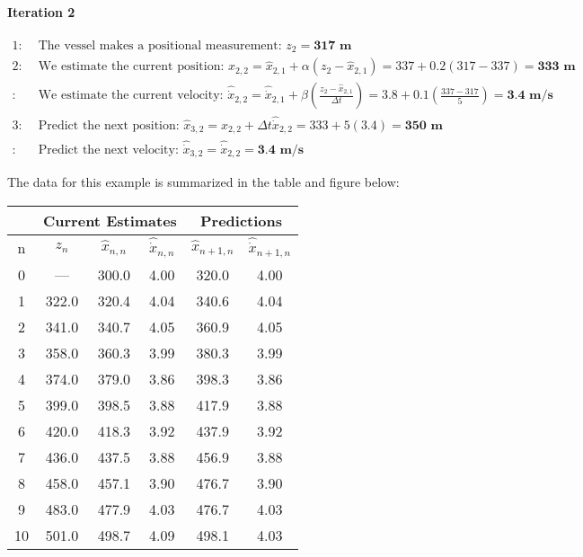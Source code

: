 \begin{example}
        \paragraph{Iteration 2}
        \begin{equation*}
            \begin{aligned} 
                1:& \text{ The vessel makes a positional measurement: } z_2 = \textbf{317 m} \\
                2:& \text{ We estimate the current position: } \hat{x}_{2,2} = \hat{x}_{2,1} + \alpha(z_2 - \hat{x}_{2,1}) = 337 + 0.2(317 - 337) = \textbf{333 m} \\
                 :& \text{ We estimate the current velocity: } \hat{\dot{x}}_{2,2} = \hat{\dot{x}}_{2,1} + \beta(\frac{z_2 - \hat{x}_{2,1}}{\Delta t}) = 3.8 + 0.1(\frac{337 - 317}{5}) = \textbf{3.4 m/s} \\
                3:& \text{ Predict the next position: } \hat{x}_{3,2} = \hat{x}_{2,2} + \Delta t \hat{\dot{x}}_{2,2} = 333 + 5(3.4) = \textbf{350 m} \\
                 :& \text{ Predict the next velocity: } \hat{\dot{x}}_{3,2} = \hat{\dot{x}}_{2,2} = \textbf{3.4 m/s}
            \end{aligned}
        \end{equation*}

        The data for this example is summarized in the table and figure below:

        \begin{center}
            \begin{tabular}{c | c | c | c | c | c}
            \toprule
            & \multicolumn{3}{|c|}{Current Estimates} & \multicolumn{2}{c}{Predictions} \\
            \midrule
            n & $z_n$ & $\hat{x}_{n,n}$ & $ \hat{\dot{x}}_{n,n} $ & $ \hat{x}_{n+1,n}$ & $ \hat{\dot{x}}_{n+1,n} $ \\
            \midrule

            0  &  ---  & 300.0 & 4.00 & 320.0 & 4.00 \\
            1  & 322.0 & 320.4 & 4.04 & 340.6 & 4.04 \\
            2  & 341.0 & 340.7 & 4.05 & 360.9 & 4.05 \\
            3  & 358.0 & 360.3 & 3.99 & 380.3 & 3.99 \\
            4  & 374.0 & 379.0 & 3.86 & 398.3 & 3.86 \\
            5  & 399.0 & 398.5 & 3.88 & 417.9 & 3.88 \\
            6  & 420.0 & 418.3 & 3.92 & 437.9 & 3.92 \\
            7  & 436.0 & 437.5 & 3.88 & 456.9 & 3.88 \\
            8  & 458.0 & 457.1 & 3.90 & 476.7 & 3.90 \\
            9  & 483.0 & 477.9 & 4.03 & 476.7 & 4.03 \\
            10 & 501.0 & 498.7 & 4.09 & 498.1 & 4.03 \\


\end{tabular}
\end{center}
\end{example}
